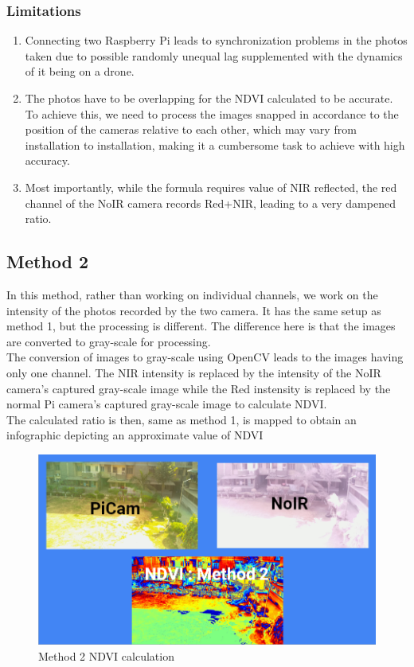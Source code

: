 \subsubsection{Limitations}
\begin{enumerate}
    \item Connecting two Raspberry Pi leads to synchronization problems in the photos taken due to possible randomly unequal lag supplemented with the dynamics of it being on a drone.
    \item The photos have to be overlapping for the NDVI calculated to be accurate. To achieve this, we need to process the images snapped in accordance to the position of the cameras relative to each other, which may vary from installation to installation, making it a cumbersome task to achieve with high accuracy.
    \item Most importantly, while the formula requires value of NIR reflected, the red channel of the NoIR camera records Red+NIR, leading to a very dampened ratio.
\end{enumerate}
\subsection{Method 2}
In this method, rather than working on individual channels, we work on the intensity of the photos recorded by the two camera. It has the same setup as method 1, but the processing is different. The difference here is that the images are converted to gray-scale for processing.
\\
The conversion of images to gray-scale using OpenCV leads to the images having only one channel. The NIR intensity is replaced by the intensity of the NoIR camera's captured gray-scale image while the Red instensity is replaced by the normal Pi camera's captured gray-scale image to calculate NDVI.
\\
The calculated ratio is then, same as method 1, is mapped to obtain an infographic depicting an approximate value of NDVI

\begin{figure}[H]
    \centering
    \includegraphics[width=\linewidth]{SummerInterReport/project/Images-Major/ndvi_two.png}
    \caption{Method 2 NDVI calculation}
    \label{fig:compEy}
\end{figure}

